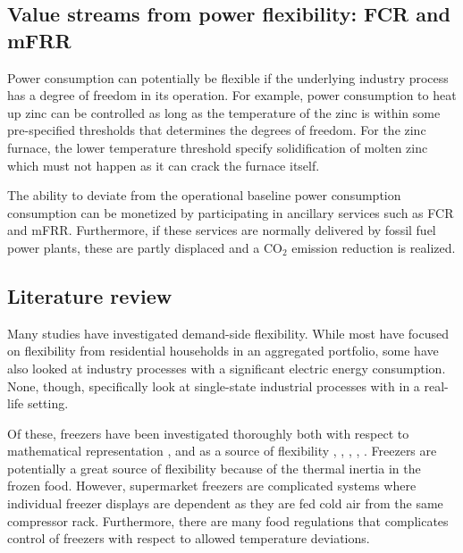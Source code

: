\documentclass[lettersize,journal]{IEEEtran}
\begin{document}
\subsection{Value streams from power flexibility: FCR and mFRR}

Power consumption can potentially be flexible if the underlying industry process has a  degree of freedom in its operation. For example, power consumption to heat up zinc can be controlled as long as the temperature of the zinc is within some pre-specified thresholds that determines the degrees of freedom. For the zinc furnace, the lower temperature threshold specify solidification of molten zinc which must not happen as it can crack the furnace itself.

The ability to deviate from the operational baseline power consumption consumption can be monetized by participating in ancillary services such as FCR and mFRR. Furthermore, if these services are normally delivered by fossil fuel power plants, these are partly displaced and a CO$_{2}$ emission reduction is realized.


\subsection{Literature review}

Many studies have investigated demand-side flexibility. While most have focused on flexibility from residential households in an aggregated portfolio, some have also looked at industry processes with a significant electric energy consumption. None, though, specifically look at single-state industrial processes with in a real-life setting.

\IEEEpubidadjcol

Of these, freezers have been investigated thoroughly both with respect to mathematical representation \cite{shafiei2013modeling}, \cite{pedersen2016improving}  and as a source of flexibility \cite{sossan2016grey}, \cite{o2013modelling}, \cite{de2019leveraging}, \cite{misaghian2022fast}, \cite{vrettos2016fast}. Freezers are potentially a great source of flexibility because of the thermal inertia in the frozen food. However, supermarket freezers are complicated systems where individual freezer displays are dependent as they are fed cold air from the same compressor rack. Furthermore, there are many food regulations that complicates control of freezers with respect to allowed temperature deviations.
\end{document}
